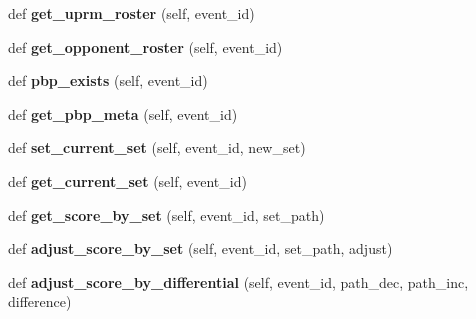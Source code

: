 \begin{DoxyCompactItemize}
\mbox{\label{classpbp__dao_1_1_p_b_p_dao_ae2289620b6388f40af706531c426dd69}} 
def {\bfseries get\+\_\+uprm\+\_\+roster} (self, event\+\_\+id)
\item 
\mbox{\label{classpbp__dao_1_1_p_b_p_dao_a9f186af1f2096fe3b99f9879f23ae139}} 
def {\bfseries get\+\_\+opponent\+\_\+roster} (self, event\+\_\+id)
\item 
\mbox{\label{classpbp__dao_1_1_p_b_p_dao_a3c7e7f7acea64362de4cebd496c44b1c}} 
def {\bfseries pbp\+\_\+exists} (self, event\+\_\+id)
\item 
\mbox{\label{classpbp__dao_1_1_p_b_p_dao_a500e36abfe87b2e4e58399b7aaa1bd3f}} 
def {\bfseries get\+\_\+pbp\+\_\+meta} (self, event\+\_\+id)
\item 
\mbox{\label{classpbp__dao_1_1_p_b_p_dao_af97b1f7772f5b1c3d378693ac8c4264d}} 
def {\bfseries set\+\_\+current\+\_\+set} (self, event\+\_\+id, new\+\_\+set)
\item 
\mbox{\label{classpbp__dao_1_1_p_b_p_dao_a46985b1c22d4980300f908c2db49b206}} 
def {\bfseries get\+\_\+current\+\_\+set} (self, event\+\_\+id)
\item 
\mbox{\label{classpbp__dao_1_1_p_b_p_dao_a567ccae5fcfef4a5cd823b54dc08b607}} 
def {\bfseries get\+\_\+score\+\_\+by\+\_\+set} (self, event\+\_\+id, set\+\_\+path)
\item 
\mbox{\label{classpbp__dao_1_1_p_b_p_dao_a0a0a5eff321532b58f2b5b19cc34e01e}} 
def {\bfseries adjust\+\_\+score\+\_\+by\+\_\+set} (self, event\+\_\+id, set\+\_\+path, adjust)
\item 
\mbox{\label{classpbp__dao_1_1_p_b_p_dao_ac57355d705ed373c5fead79ab7cc6942}} 
def {\bfseries adjust\+\_\+score\+\_\+by\+\_\+differential} (self, event\+\_\+id, path\+\_\+dec, path\+\_\+inc, difference)
\item 
\mbox{\label{classpbp__dao_1_1_p_b_p_dao_a4e8b6442fe16bd7f06024be09dafc52f}} 

\end{DoxyCompactItemize}
